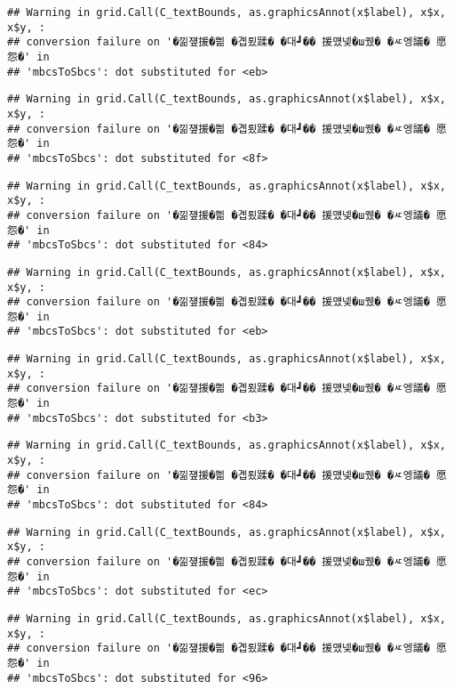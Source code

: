 \documentclass[
]{article}
\begin{document}
\begin{verbatim}
## Warning in grid.Call(C_textBounds, as.graphicsAnnot(x$label), x$x, x$y, :
## conversion failure on '�낆쟾援�쁾 �곕룄蹂� �대┛�� 援먰넻�ш퀬� �ㅼ엥議� 愿怨�' in
## 'mbcsToSbcs': dot substituted for <eb>
\end{verbatim}

\begin{verbatim}
## Warning in grid.Call(C_textBounds, as.graphicsAnnot(x$label), x$x, x$y, :
## conversion failure on '�낆쟾援�쁾 �곕룄蹂� �대┛�� 援먰넻�ш퀬� �ㅼ엥議� 愿怨�' in
## 'mbcsToSbcs': dot substituted for <8f>
\end{verbatim}

\begin{verbatim}
## Warning in grid.Call(C_textBounds, as.graphicsAnnot(x$label), x$x, x$y, :
## conversion failure on '�낆쟾援�쁾 �곕룄蹂� �대┛�� 援먰넻�ш퀬� �ㅼ엥議� 愿怨�' in
## 'mbcsToSbcs': dot substituted for <84>
\end{verbatim}

\begin{verbatim}
## Warning in grid.Call(C_textBounds, as.graphicsAnnot(x$label), x$x, x$y, :
## conversion failure on '�낆쟾援�쁾 �곕룄蹂� �대┛�� 援먰넻�ш퀬� �ㅼ엥議� 愿怨�' in
## 'mbcsToSbcs': dot substituted for <eb>
\end{verbatim}

\begin{verbatim}
## Warning in grid.Call(C_textBounds, as.graphicsAnnot(x$label), x$x, x$y, :
## conversion failure on '�낆쟾援�쁾 �곕룄蹂� �대┛�� 援먰넻�ш퀬� �ㅼ엥議� 愿怨�' in
## 'mbcsToSbcs': dot substituted for <b3>
\end{verbatim}

\begin{verbatim}
## Warning in grid.Call(C_textBounds, as.graphicsAnnot(x$label), x$x, x$y, :
## conversion failure on '�낆쟾援�쁾 �곕룄蹂� �대┛�� 援먰넻�ш퀬� �ㅼ엥議� 愿怨�' in
## 'mbcsToSbcs': dot substituted for <84>
\end{verbatim}

\begin{verbatim}
## Warning in grid.Call(C_textBounds, as.graphicsAnnot(x$label), x$x, x$y, :
## conversion failure on '�낆쟾援�쁾 �곕룄蹂� �대┛�� 援먰넻�ш퀬� �ㅼ엥議� 愿怨�' in
## 'mbcsToSbcs': dot substituted for <ec>
\end{verbatim}

\begin{verbatim}
## Warning in grid.Call(C_textBounds, as.graphicsAnnot(x$label), x$x, x$y, :
## conversion failure on '�낆쟾援�쁾 �곕룄蹂� �대┛�� 援먰넻�ш퀬� �ㅼ엥議� 愿怨�' in
## 'mbcsToSbcs': dot substituted for <96>
\end{verbatim}
\end{document}

